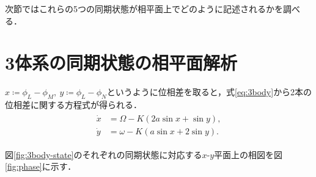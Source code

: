 \documentclass[../main]{subfiles}
\begin{document}
次節ではこれらの5つの同期状態が相平面上でどのように記述されるかを調べる．
\section{3体系の同期状態の相平面解析}
\label{sec:3body-phase-plane}
$x\coloneqq \phi_L-\phi_M,\ y\coloneqq\phi_L-\phi_N$というように位相差を取ると，式\eqref{eq:3body}から2本の位相差に関する方程式が得られる．
\begin{align}
    \label{eq:phase-diff}
    \begin{split}
    \dot{x}&=\Omega-K(2a\sin x+\sin y),\\
    \dot{y}&=\omega-K(a\sin x+2\sin y).
    \end{split}
\end{align}

図\ref{fig:3body-state}のそれぞれの同期状態に対応する$x$-$y$平面上の相図を図\ref{fig:phase}に示す．
\end{document}
